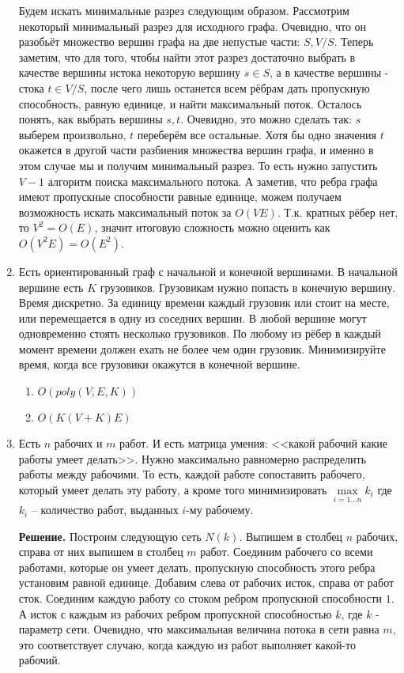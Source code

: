 \begin{enumerate}
	Будем искать минимальные разрез следующим образом. Рассмотрим некоторый минимальный разрез для исходного 
	графа. Очевидно, что он разобьёт множество вершин графа на две непустые части: $S, V / S$. Теперь заметим, 
	что для того, чтобы найти этот разрез достаточно выбрать в качестве вершины истока некоторую вершину $s \in 
	S$, а в качестве вершины - стока $t \in V / S$, после чего лишь останется всем рёбрам дать пропускную 
	способность, равную единице, и найти максимальный поток. Осталось понять, как выбрать вершины $s, t$. 
	Очевидно, это можно сделать так: $s$ выберем произвольно, $t$ переберём все остальные. Хотя бы одно значения 
	$t$ окажется в другой части разбиения множества вершин графа, и именно в этом случае мы и получим минимальный 
	разрез. То есть нужно запустить $V - 1$ алгоритм поиска максимального потока. А заметив, что ребра графа 
	имеют пропускные способности равные единице, можем получаем возможность искать максимальный поток за $O(VE)$. 
	Т.к. кратных рёбер нет, то $V^2 = O(E)$, значит итоговую сложность можно оценить как $O(V^2E) = O(E^2)$. 
	
	\item Есть ориентированный граф с начальной и конечной вершинами. В начальной вершине есть $K$ грузовиков. 
	Грузовикам нужно попасть в конечную вершину. Время дискретно. За единицу времени каждый грузовик или стоит на 
	месте, или перемещается в одну из соседних вершин. В любой вершине могут одновременно стоять несколько 
	грузовиков. По любому из рёбер в каждый момент времени должен ехать не более чем один грузовик. Минимизируйте 
	время, когда все грузовики окажутся в конечной вершине.
	\begin{enumerate}
		\item $O(poly(V, E, K))$
		\item $O(K(V + K)E)$
	\end{enumerate}
	
	\item Есть $n$ рабочих и $m$ работ. И есть матрица умения: <<какой рабочий какие работы умеет делать>>. Нужно 
	максимально равномерно распределить работы между рабочими. То есть, каждой работе сопоставить рабочего, который 
	умеет делать эту работу, а кроме того минимизировать $\max\limits_{i=1\dots n} k_i$ где $k_i$ – количество 
	работ, выданных $i$-му рабочему.
	
	\textbf{Решение.} Построим следующую сеть $N(k)$. Выпишем в столбец $n$ рабочих, справа от них выпишем в 
	столбец $m$ работ. Соединим рабочего со всеми работами, которые он умеет делать, пропускную способность 
	этого ребра установим равной единице. Добавим слева от рабочих исток, справа от работ сток. Соединим каждую 
	работу со стоком ребром пропускной способности $1$. А исток с каждым из рабочих ребром пропускной 
	способностью $k$, где $k$ - параметр сети. Очевидно, что максимальная величина потока в сети равна $m$, это 
	соответствует случаю, когда каждую из работ выполняет какой-то рабочий.
	

\end{enumerate}
